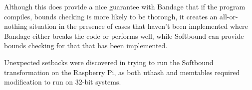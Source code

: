 \documentclass[a4paper,12pt,twoside,openright]{report}
\begin{document}
Although this does provide a nice guarantee with Bandage that if the program compiles, bounds checking is more likely to be thorough, it creates an all-or-nothing situation in the presence of cases that haven't been implemented where Bandage either breaks the code or performs well, while Softbound can provide bounds checking for that that has been implemented.

Unexpected setbacks were discovered in trying to run the Softbound transformation on the Raspberry Pi, as both uthash and memtables required modification to run on 32-bit systems.

\appendix
\singlespacing

 
 
\end{document}
